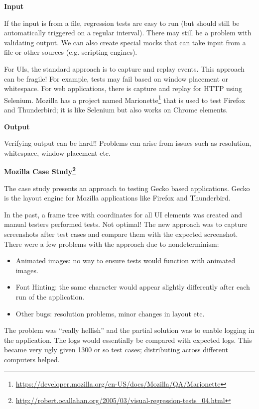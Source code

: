 \documentclass[11pt]{article}
\begin{document}
\textbf{Input}

If the input is from a file, regression tests are easy to run (but should still be automatically triggered on a regular interval). There may still be a problem with validating output. We can also create special mocks that can take input from a file or other sources (e.g. scripting engines). 

For UIs, the standard approach is to capture and replay events. This approach can be fragile! For example, tests may fail based on window placement or whitespace. For web applications, there is capture and replay for HTTP using Selenium. Mozilla has a project named Marionette\footnote{\url{https://developer.mozilla.org/en-US/docs/Mozilla/QA/Marionette}} that is used to test Firefox and Thunderbird; it is like Selenium but also works on Chrome elements. 

\textbf{Output}

Verifying output can be hard!! Problems can arise from issues such as resolution, whitespace, window placement etc. 

\textbf{Mozilla Case Study\footnote{\url{http://robert.ocallahan.org/2005/03/visual-regression-tests_04.html}}}

The case study presents an approach to testing Gecko based applications. Gecko is the layout engine for Mozilla applications like Firefox and Thunderbird. 

In the past, a frame tree with coordinates for all UI elements was created and manual testers performed tests. Not optimal! The new approach was to capture screenshots after test cases and compare them with the expected screenshot. There were a few problems with the approach due to nondeterminism: 

\begin{itemize}
\item Animated images: no way to ensure tests would function with animated images.
\item Font Hinting: the same character would appear slightly differently after each run of the application.
\item Other bugs: resolution problems, minor changes in layout etc.
\end{itemize}

The problem was ``really hellish'' and the partial solution was to enable logging in the application. The logs would essentially be compared with expected logs. This became very ugly given 1300 or so test cases; distributing across different computers helped.
\end{document}
